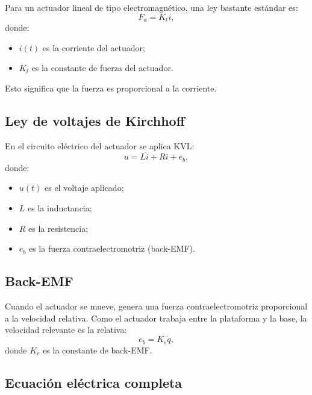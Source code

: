\documentclass[11pt]{article}
\begin{document}
Para un actuador lineal de tipo electromagn\'etico, una ley bastante est\'andar es:
\begin{equation}
F_a = K_t i,
\label{eq:force_current}
\end{equation}
donde:

\begin{itemize}[leftmargin=1.2cm]
\item $i(t)$ es la corriente del actuador;
\item $K_t$ es la constante de fuerza del actuador.
\end{itemize}

Esto significa que la fuerza es proporcional a la corriente.

\subsection{Ley de voltajes de Kirchhoff}

En el circuito el\'ectrico del actuador se aplica KVL:
\begin{equation}
u = L\dot{i} + Ri + e_b,
\label{eq:kvl}
\end{equation}
donde:

\begin{itemize}[leftmargin=1.2cm]
\item $u(t)$ es el voltaje aplicado;
\item $L$ es la inductancia;
\item $R$ es la resistencia;
\item $e_b$ es la fuerza contraelectromotriz (back-EMF).
\end{itemize}

\subsection{Back-EMF}

Cuando el actuador se mueve, genera una fuerza contraelectromotriz proporcional a la velocidad relativa. Como el actuador trabaja entre la plataforma y la base, la velocidad relevante es la relativa:
\begin{equation}
e_b = K_e \dot{q},
\label{eq:bemf}
\end{equation}
donde $K_e$ es la constante de back-EMF.

\subsection{Ecuaci\'on el\'ectrica completa}
\end{document}
